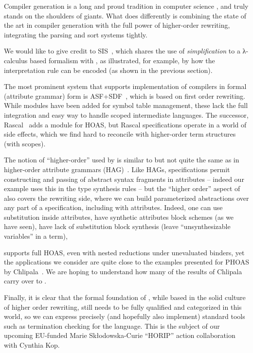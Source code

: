 \documentclass[letterpaper]{article}
\begin{document}
Compiler generation is a long and proud tradition in computer science
\cite{GilbertMcLellan:sjcp1967,%
  FeldmanGries:cacm1968,%
  Mosses:daimi1979,%
  Gaudel:fpc1981,%
  BjornerJones:1982,%
  CameronIto:toplas1984,%
  Wand:sn1984,%
  Borras+:sde1988,%
  Brand+:toplas2002,%
  Bos+:eptcs2011}, and \HAX truly stands on the shoulders of giants. What \HAX does differently is
combining the state of the art in compiler generation with the full power of higher-order rewriting,
integrating the parsing and sort systems tightly.

We would like to give credit to SIS~\cite{Mosses:daimi1979}, which shares the use of
\emph{simplification} to a λ-calculus based formalism with \HAX, as illustrated, for example, by how
the interpretation rule can be encoded (as shown in the previous section).

The most prominent system that supports implementation of compilers in formal (attribute grammar)
form is ASF+SDF~\cite{Brand+:toplas2002}, which is based on first order rewriting. While modules
have been added for symbol table management, these lack the full integration and easy way to handle
scoped intermediate languages. The successor, Rascal~\cite{Bos+:eptcs2011} adds a module for HOAS,
but Rascal specifications operate in a world of side effects, which we find hard to reconcile with
higher-order term structures (with scopes).

The notion of ``higher-order'' used by \HAX is similar to but not quite the same as in higher-order
attribute grammars (HAG)~\cite{VogtSwierstraKuiper:pldi1989}. Like HAGs, \HAX specifications permit
constructing and passing of abstract syntax fragments in attributes -- indeed our example uses this
in the type synthesis rules -- but the ``higher order'' aspect of \HAX also covers the rewriting
side, where we can build parameterized abstractions over any part of a specification, including with
attributes. Indeed, one can use substitution inside attributes, have synthetic attributes block
schemes (as we have seen), have lack of substitution block synthesis (leave ``unsynthesizable
variables'' in a term), \etc

\HAX supports full HOAS, even with nested reductions under unevaluated binders, yet the applications
we consider are quite close to the examples presented for PHOAS by
Chlipala~\cite{Chlipala:icfp2008}. We are hoping to understand how many of the results of Chlipala
carry over to \HAX.

Finally, it is clear that the formal foundation of \HAX, while based in the solid culture of higher
order rewriting, still needs to be fully qualified and categorized in this world, so we can express
precisely (and hopefully also implement) standard tools such as termination checking for the
language. This is the subject of our upcoming EU-funded Marie Skłodowska-Curie ``HORIP'' action
collaboration with Cynthia Kop.
\end{document}
